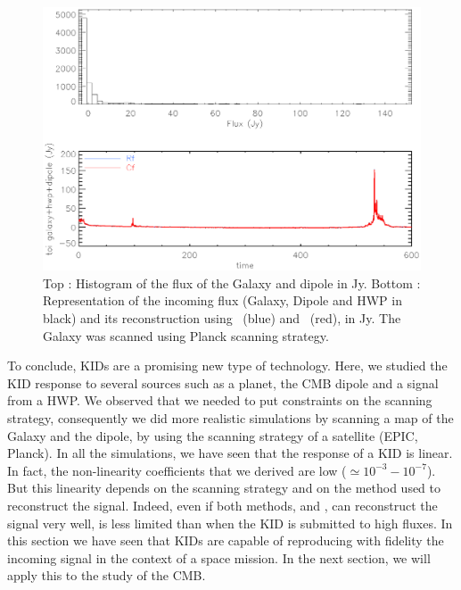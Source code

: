 \begin{figure}[h]
\center
	\includegraphics[scale=0.53]{Figures/histo_gal_dip_planck.eps}
	\caption{Top : Histogram of the flux of the Galaxy and dipole in Jy. Bottom : Representation of the incoming flux (Galaxy, Dipole and HWP in black) and its reconstruction using \rf\ (blue) and \cf\ (red), in Jy. The Galaxy was scanned using Planck scanning strategy.}
	\label{fig:histo-gal-dip}
\end{figure}



To conclude, KIDs are a promising new type of technology. Here, we studied the KID response to several sources such as a planet, the CMB dipole and a signal from a HWP. We observed that we needed to put constraints on the scanning strategy, consequently we did more realistic simulations by scanning a map of the Galaxy and the dipole, by using the scanning strategy of a satellite (EPIC, Planck). In all the simulations, we have seen that the response of a KID is linear. In fact, the non-linearity coefficients that we derived are low (\eps $\simeq 10^{-3} - 10^{-7}$). But this linearity depends on the scanning strategy and on the method used to reconstruct the signal. Indeed, even if both methods, \rf and \cf, can reconstruct the signal very well, \cf is less limited than \rf when the KID is submitted to high fluxes.
In this section we have seen that KIDs are capable of reproducing with fidelity the incoming signal in the context of a space mission. In the next section, we will apply this to the study of the CMB. 


